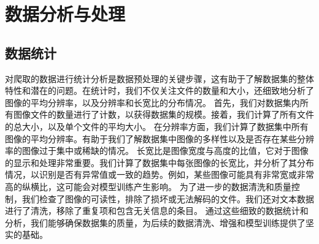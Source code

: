 \documentclass[a4paper]{zreport}
\begin{document}
\section{数据分析与处理}

\subsection{数据统计}
对爬取的数据进行统计分析是数据预处理的关键步骤，这有助于了解数据集的整体特性和潜在的问题。在统计时，我们不仅关注文件的数量和大小，还细致地分析了图像的平均分辨率，以及分辨率和长宽比的分布情况。
首先，我们对数据集内所有图像文件的数量进行了计数，以获得数据集的规模。接着，我们计算了所有文件的总大小，以及单个文件的平均大小。
在分辨率方面，我们计算了数据集中所有图像的平均分辨率。有助于我们了解数据集中图像的多样性以及是否存在某些分辨率的图像过于集中或稀缺的情况。
长宽比是图像宽度与高度的比值，它对于图像的显示和处理非常重要。我们计算了数据集中每张图像的长宽比，并分析了其分布情况，以识别是否有异常值或一致的趋势。例如，某些图像可能具有非常宽或非常高的纵横比，这可能会对模型训练产生影响。
为了进一步的数据清洗和质量控制，我们检查了图像的可读性，排除了损坏或无法解码的文件。我们还对文本数据进行了清洗，移除了重复项和包含无关信息的条目。
通过这些细致的数据统计和分析，我们能够确保数据集的质量，为后续的数据清洗、增强和模型训练提供了坚实的基础。
\end{document}

